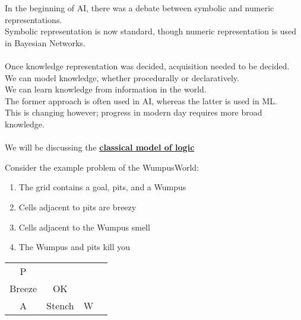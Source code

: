 \documentclass[../../lecture_notes.tex]{subfiles}
\begin{document}
\noindent In the beginning of AI, there was a debate between symbolic and numeric representations.\\
Symbolic representation is now standard, though numeric representation is used in Bayesian Networks.\\
\\
Once knowledge representation was decided, acquisition needed to be decided.\\
	\indent We can model knowledge, whether procedurally or declaratively.\\
	\indent We can learn knowledge from information in the world.\\
The former approach is often used in AI, whereas the latter is used in ML.\\
This is changing however; progress in modern day requires more broad knowledge.\\
\\
We will be discussing the \textbf{\underline{classical model of logic}}

\begin{center}  \end{center}

\begin{center} \begin{minipage}{0.5\textwidth}
\noindent Consider the example problem of the WumpusWorld:
\begin{enumerate} [itemsep=0mm]
	\item The grid contains a goal, pits, and a Wumpus
	\item Cells adjacent to pits are breezy
	\item Cells adjacent to the Wumpus smell
	\item The Wumpus and pits kill you
\end{enumerate} \end{minipage}%
\begin{minipage}{0.5\textwidth}
\begin{tabular}{ | c | c | c | c | }
	\hline
	 \text{      } & \text{      } & \text{      } & \text{      } \\
	\hline
	P &  &  &  \\
	\hline
	Breeze & OK & & \\
	\hline
	A & Stench & W & \\
	\hline
\end{tabular} \end{minipage} \end{center}
\end{document}
